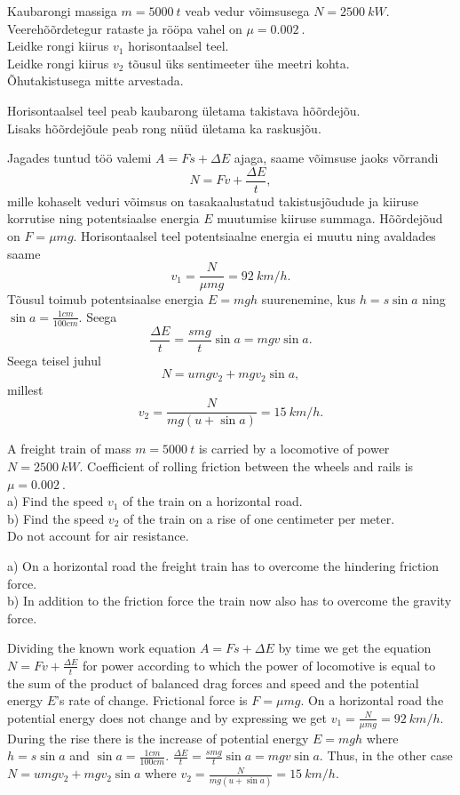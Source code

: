 
Kaubarongi massiga $m=\SI{5000}{t}$ veab vedur võimsusega $N=\SI{2500}{kW}$. Veerehõõrdetegur rataste ja rööpa vahel on $\mu=\SI{0,002}{}$.\\
\osa Leidke rongi kiirus $v_1$ horisontaalsel teel.\\
\osa Leidke rongi kiirus $v_2$ tõusul üks sentimeeter ühe meetri kohta.\\
Õhutakistusega mitte arvestada.

\hint
\osa Horisontaalsel teel peab kaubarong ületama takistava hõõrdejõu.\\
\osa Lisaks hõõrdejõule peab rong nüüd ületama ka raskusjõu.

\solu
Jagades tuntud töö valemi $A=Fs+\Delta E$ ajaga, saame võimsuse jaoks võrrandi 
\[
N=Fv+\frac{\Delta E}{t},
\]
mille kohaselt veduri võimsus on tasakaalustatud takistusjõudude ja kiiruse korrutise ning potentsiaalse energia $E$ muutumise kiiruse summaga. Hõõrdejõud on $F=\mu mg$. Horisontaalsel teel potentsiaalne energia ei muutu ning avaldades saame
\[
v_1=\frac{N}{\mu mg}=\SI{92}{km \per h}.
\]
Tõusul toimub potentsiaalse energia $E=mgh$ suurenemine, kus $h=s\sin a$ ning $\sin a=\frac{1cm}{100cm}$. Seega
\[
\frac{\Delta E}{t}=\frac{smg}{t}\sin a=mgv\sin a.
\]
Seega teisel juhul
\[
N=umgv_2+mgv_2\sin a,
\]
millest
\[
v_2=\frac{N}{mg(u+\sin a)}=\SI{15}{km \per h}.
\]

A freight train of mass $m=\SI{5000}{t}$ is carried by a locomotive of power $N=\SI{2500}{kW}$. Coefficient of rolling friction between the wheels and rails is $\mu=\SI{0,002}{}$.\\
a) Find the speed $v_1$ of the train on a horizontal road.\\
b) Find the speed $v_2$ of the train on a rise of one centimeter per meter.\\
Do not account for air resistance.

\hinteng
a) On a horizontal road the freight train has to overcome the hindering friction force.\\
b) In addition to the friction force the train now also has to overcome the gravity force.

\solueng
Dividing the known work equation $A=Fs+\Delta E$ by time we get the equation $N=Fv+\frac{\Delta E}{t}$ for power according to which the power of locomotive is equal to the sum of the product of balanced drag forces and speed and the potential energy $E$’s rate of change. Frictional force is $F=\mu mg$. On a horizontal road the potential energy does not change and by expressing we get $v_1=\frac{N}{\mu mg}=\SI{92}{km \per h}$. During the rise there is the increase of potential energy $E=mgh$ where $h=s\sin a$ and $\sin a= \frac{1cm}{100cm}$. $\frac{\Delta E}{t}=\frac{smg}{t}\sin a=mgv\sin a$. Thus, in the other case $N=umgv_2+mgv_2\sin a$ where $v_2=\frac{N}{mg(u+\sin a)}=\SI{15}{km \per h}$.
\probend